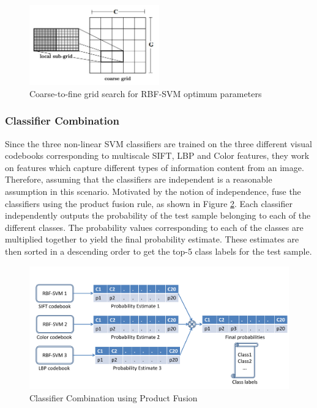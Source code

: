 \documentclass[12pt]{article}
\begin{document}
\begin{figure}
\centering
\includegraphics[width = 0.5\textwidth, height =0.2\textheight]{gridsearch}
\caption{Coarse-to-fine grid search for RBF-SVM optimum parameters}
\label{fig:gridsearch}
\end{figure}

\subsubsection{Classifier Combination}
Since the three non-linear SVM classifiers are trained on the three different visual codebooks corresponding to multiscale SIFT, LBP and Color features, they work on features which capture different types of information content from an image.
Therefore, assuming that the classifiers are independent is a reasonable assumption in this scenario.
Motivated by the notion of independence, fuse the classifiers using the product fusion rule, as shown in Figure \ref{fig:classifiercombination}.
Each classifier independently outputs the probability of the test sample belonging to each of the different classes.
The probability values corresponding to each of the classes are multiplied together to yield the final probability estimate.
These estimates are then sorted in a descending order to get the top-5 class labels for the test sample.

\begin{figure}
\includegraphics[width = 1\textwidth]{classifiercombination}
\caption{Classifier Combination using Product Fusion}
\label{fig:classifiercombination}
\end{figure}
\end{document}
